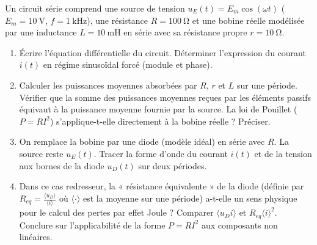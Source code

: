\documentclass[11pt]{article}
\begin{document}
\begin{exercice}
Un circuit série comprend une source de tension $u_E(t) = E_m \cos(\omega t)$ ($E_m = \SI{10}{\volt}$, $f = \SI{1}{\kilo\hertz}$), une résistance $R = \SI{100}{\ohm}$ et une bobine réelle modélisée par une inductance $L = \SI{10}{\milli\henry}$ en série avec sa résistance propre $r = \SI{10}{\ohm}$.
\begin{enumerate}
    \item Écrire l'équation différentielle du circuit. Déterminer l'expression du courant $i(t)$ en régime sinusoïdal forcé (module et phase).
    \item Calculer les puissances moyennes absorbées par $R$, $r$ et $L$ sur une période. Vérifier que la somme des puissances moyennes reçues par les éléments passifs équivaut à la puissance moyenne fournie par la source. La loi de Pouillet ($P = R I^2$) s'applique-t-elle directement à la bobine réelle ? Préciser.
    \item On remplace la bobine par une diode (modèle idéal) en série avec $R$. La source reste $u_E(t)$. Tracer la forme d'onde du courant $i(t)$ et de la tension aux bornes de la diode $u_D(t)$ sur deux périodes.
    \item Dans ce cas redresseur, la « résistance équivalente » de la diode (définie par $R_{eq} = \frac{\langle u_D \rangle}{\langle i \rangle}$ où $\langle \cdot \rangle$ est la moyenne sur une période) a-t-elle un sens physique pour le calcul des pertes par effet Joule ? Comparer $\langle u_D i \rangle$ et $R_{eq} \langle i \rangle^2$. Conclure sur l'applicabilité de la forme $P = R I^2$ aux composants non linéaires.
\end{enumerate}
\end{exercice}
\end{document}
